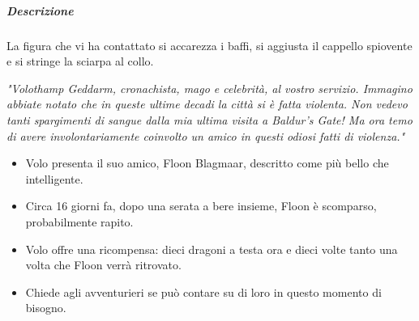 \documentclass{article}
\begin{document}
                        \subparagraph{Descrizione} La figura che vi ha contattato si accarezza i baffi, si aggiusta il cappello spiovente e si stringe la sciarpa al collo.

                        \textit{"Volothamp Geddarm, cronachista, mago e celebrità, al vostro servizio. Immagino abbiate notato che in queste ultime decadi la città si è fatta violenta. Non vedevo tanti spargimenti di sangue dalla mia ultima visita a Baldur's Gate! Ma ora temo di avere involontariamente coinvolto un amico in questi odiosi fatti di violenza."}
                        
                        \begin{itemize}
                            \item Volo presenta il suo amico, Floon Blagmaar, descritto come più bello che intelligente.
                            \item Circa 16 giorni fa, dopo una serata a bere insieme, Floon è scomparso, probabilmente rapito.
                            \item Volo offre una ricompensa: dieci dragoni a testa ora e dieci volte tanto una volta che Floon verrà ritrovato.
                            \item Chiede agli avventurieri se può contare su di loro in questo momento di bisogno.
                        \end{itemize}
                        
\end{document}
